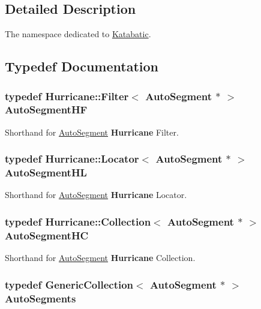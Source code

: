 \subsection{Detailed Description}
The namespace dedicated to \hyperlink{namespaceKatabatic}{Katabatic}. 

\subsection{Typedef Documentation}
\hypertarget{namespaceKatabatic_a790418bb65a9a13859868df3e8f53598}{
\subsubsection[{Auto\-Segment\-H\-F}]{\setlength{\rightskip}{0pt plus 5cm}typedef {\bf Hurricane\-::\-Filter}$<$ {\bf Auto\-Segment} $\ast$ $>$ {\bf Auto\-Segment\-H\-F}}}\label{namespaceKatabatic_a790418bb65a9a13859868df3e8f53598}
Shorthand for \hyperlink{classKatabatic_1_1AutoSegment}{Auto\-Segment} {\bf Hurricane} Filter. \hypertarget{namespaceKatabatic_a40ef13471fd0e797b75d3c436813fe65}{
\subsubsection[{Auto\-Segment\-H\-L}]{\setlength{\rightskip}{0pt plus 5cm}typedef {\bf Hurricane\-::\-Locator}$<$ {\bf Auto\-Segment} $\ast$ $>$ {\bf Auto\-Segment\-H\-L}}}\label{namespaceKatabatic_a40ef13471fd0e797b75d3c436813fe65}
Shorthand for \hyperlink{classKatabatic_1_1AutoSegment}{Auto\-Segment} {\bf Hurricane} Locator. \hypertarget{namespaceKatabatic_acb3628dc7705fefe38a665cfe43efa6e}{
\subsubsection[{Auto\-Segment\-H\-C}]{\setlength{\rightskip}{0pt plus 5cm}typedef {\bf Hurricane\-::\-Collection}$<$ {\bf Auto\-Segment} $\ast$ $>$ {\bf Auto\-Segment\-H\-C}}}\label{namespaceKatabatic_acb3628dc7705fefe38a665cfe43efa6e}
Shorthand for \hyperlink{classKatabatic_1_1AutoSegment}{Auto\-Segment} {\bf Hurricane} Collection. \hypertarget{namespaceKatabatic_a2221b0ddbc24f331809fc86f98e38041}{
\subsubsection[{Auto\-Segments}]{\setlength{\rightskip}{0pt plus 5cm}typedef {\bf Generic\-Collection}$<$ {\bf Auto\-Segment} $\ast$ $>$ {\bf Auto\-Segments}}}\label{namespaceKatabatic_a2221b0ddbc24f331809fc86f98e38041}
